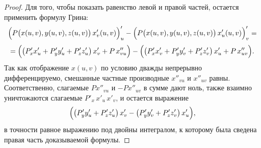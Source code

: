 \begin{proof}
Для того, чтобы показать равенство левой и правой частей, остается
применить формулу Грина:
$$
\Bigl(P\bigl(x(u,v), y(u,v), z(u,v)\bigr)\, x'_v (u,v)\Bigr)'_u - \Bigl(P\bigl(x(u,v), y(u,v), z(u,v)\bigr)\, x'_u (u,v)\Bigr)'_v = 
$$
$$
= \Bigl(\bigl(P'_x x'_u + P'_y y'_u + P'_z z'_u\bigr) \, x'_v + P\, x''_{vu} \Bigr)-
\Bigl(\bigl(P'_x x'_v + P'_y y'_v + P'_z z'_v\bigr) \,x'_u + P\, x''_{uv}\Bigr).
$$
Так как отображение $x (u,v)$ по условию дважды непрерывно дифференцируемо,
смешанные частные производные $x''_{vu}$ и $x''_{uv}$ равны. Соответственно,
слагаемые $P x''_{vu}$ и $-P x''_{uv}$ в сумме дают ноль, также взаимно уничтожаются
слагаемые $P'_x \,x'_u \,x'_v$, и остается выражение
$$
\Bigl(\bigl(P'_y y'_u + P'_z z'_u\bigr) \, x'_v - \bigl(P'_y y'_v + P'_z z'_v\bigr) \,x'_u \Bigr),
$$
в точности равное выражению под двойны интегралом, к которому была сведена правая часть доказываемой формулы.
\end{proof}







